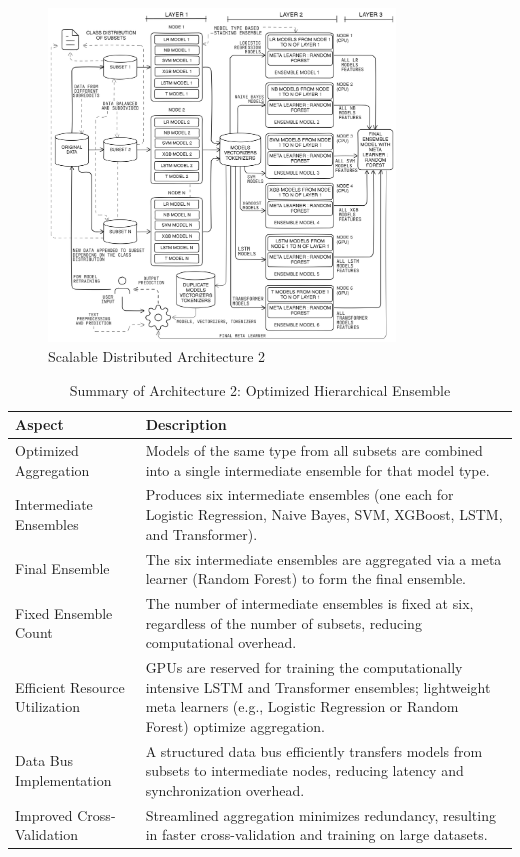 \pagebreak

\begin{figure}[h!]  
    \centering
    \includegraphics[width=0.82\textwidth]{Images/Distributed2.png}  
    \caption{Scalable Distributed Architecture 2}
    \label{lstm archi}  %
\end{figure}

\begin{table}[H]
    \caption*{Summary of Architecture 2: Optimized Hierarchical Ensemble}
    \label{tab:arch2}
    \begin{tabularx}{\textwidth}{|p{3cm}|X|}
    \hline
    \textbf{Aspect} & \textbf{Description} \\ \hline
    Optimized Aggregation & Models of the same type from all subsets are combined into a single intermediate ensemble for that model type. \\ \hline
    Intermediate Ensembles & Produces six intermediate ensembles (one each for Logistic Regression, Naive Bayes, SVM, XGBoost, LSTM, and Transformer). \\ \hline
    Final Ensemble & The six intermediate ensembles are aggregated via a meta learner (Random Forest) to form the final ensemble. \\ \hline
    Fixed Ensemble Count & The number of intermediate ensembles is fixed at six, regardless of the number of subsets, reducing computational overhead. \\ \hline
    Efficient Resource Utilization & GPUs are reserved for training the computationally intensive LSTM and Transformer ensembles; lightweight meta learners (e.g., Logistic Regression or Random Forest) optimize aggregation. \\ \hline
    Data Bus Implementation & A structured data bus efficiently transfers models from subsets to intermediate nodes, reducing latency and synchronization overhead. \\ \hline
    Improved Cross-Validation & Streamlined aggregation minimizes redundancy, resulting in faster cross-validation and training on large datasets. \\ \hline
    \end{tabularx}
\end{table}
    

